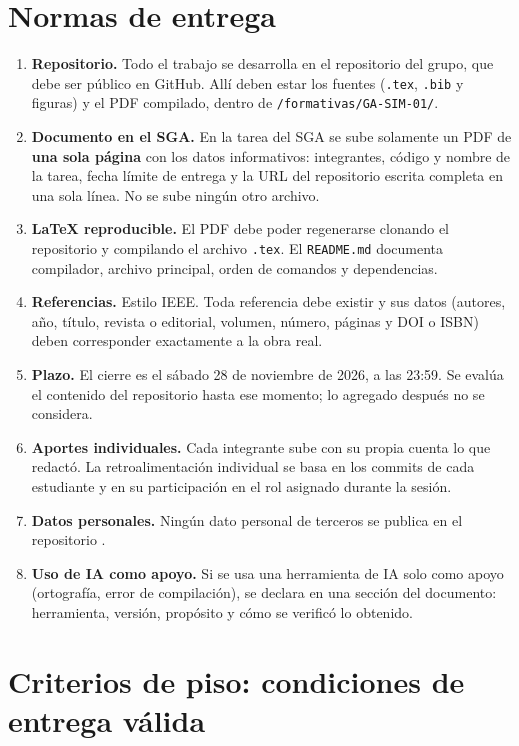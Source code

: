 \documentclass[11pt]{article}
\newcommand{\seccion}[1]{\section{\textcolor{utegreendk}{#1}}}
\begin{document}
\seccion{Normas de entrega}

\begin{enumerate}[leftmargin=20pt,itemsep=3pt]
	\item \textbf{Repositorio.} Todo el trabajo se desarrolla en el repositorio del grupo, que debe ser público en GitHub. Allí deben estar los fuentes (\texttt{.tex}, \texttt{.bib} y figuras) y el PDF compilado, dentro de \texttt{/formativas/GA-SIM-01/}.
	\item \textbf{Documento en el SGA.} En la tarea del SGA se sube solamente un PDF de \textbf{una sola página} con los datos informativos: integrantes, código y nombre de la tarea, fecha límite de entrega y la URL del repositorio escrita completa en una sola línea. No se sube ningún otro archivo.
	\item \textbf{\LaTeX{} reproducible.} El PDF debe poder regenerarse clonando el repositorio y compilando el archivo \texttt{.tex}. El \texttt{README.md} documenta compilador, archivo principal, orden de comandos y dependencias.
	\item \textbf{Referencias.} Estilo IEEE. Toda referencia debe existir y sus datos (autores, año, título, revista o editorial, volumen, número, páginas y DOI o ISBN) deben corresponder exactamente a la obra real.
	\item \textbf{Plazo.} El cierre es el sábado 28 de noviembre de 2026, a las 23:59. Se evalúa el contenido del repositorio hasta ese momento; lo agregado después no se considera.
	\item \textbf{Aportes individuales.} Cada integrante sube con su propia cuenta lo que redactó. La retroalimentación individual se basa en los commits de cada estudiante y en su participación en el rol asignado durante la sesión.
	\item \textbf{Datos personales.} Ningún dato personal de terceros se publica en el repositorio \citep{lopdp_2021}.
	\item \textbf{Uso de IA como apoyo.} Si se usa una herramienta de IA solo como apoyo (ortografía, error de compilación), se declara en una sección del documento: herramienta, versión, propósito y cómo se verificó lo obtenido.
\end{enumerate}

\seccion{Criterios de piso: condiciones de entrega válida}
\end{document}
